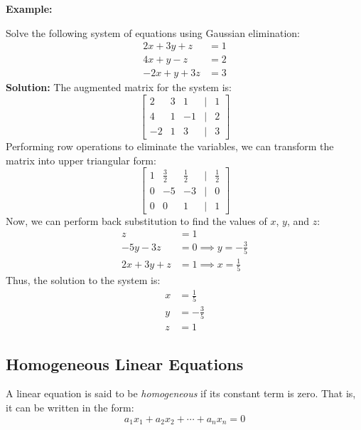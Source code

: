 \textbf{Example:}
\vspace{\baselineskip}

Solve the following system of equations using Gaussian elimination:
\begin{align*}
	2x + 3y + z  & = 1 \\
	4x + y - z   & = 2 \\
	-2x + y + 3z & = 3
\end{align*}
\textbf{Solution:} The augmented matrix for the system is:
\begin{equation*}
	\begin{bmatrix}
		2  & 3 & 1  & | & 1 \\
		4  & 1 & -1 & | & 2 \\
		-2 & 1 & 3  & | & 3
	\end{bmatrix}
\end{equation*}
Performing row operations to eliminate the variables, we can transform the matrix into upper triangular form:
\begin{equation*}
	\begin{bmatrix}
		1 & \frac{3}{2} & \frac{1}{2} & | & \frac{1}{2} \\
		0 & -5          & -3          & | & 0           \\
		0 & 0           & 1           & | & 1
	\end{bmatrix}
\end{equation*}
Now, we can perform back substitution to find the values of \(x\), \(y\), and \(z\):
\begin{align*}
	z           & = 1                           \\
	-5y - 3z    & = 0 \implies y = -\frac{3}{5} \\
	2x + 3y + z & = 1 \implies x = \frac{1}{5}
\end{align*}
Thus, the solution to the system is:
\begin{align*}
	x & = \frac{1}{5}  \\
	y & = -\frac{3}{5} \\
	z & = 1
\end{align*}

\subsection{Homogeneous Linear Equations}

A linear equation is said to be \emph{homogeneous} if its constant term is zero. That is, it can be written in the form:
\[
	a_1 x_1 + a_2 x_2 + \cdots + a_n x_n = 0
\]

